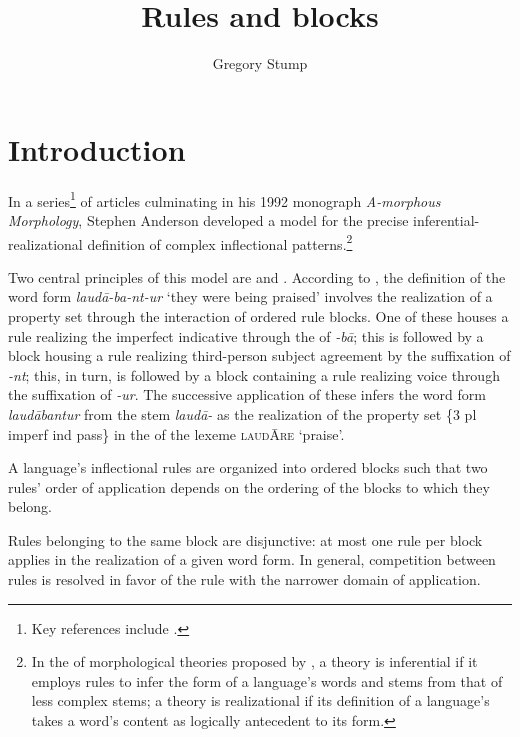 \documentclass[output=paper,
modfonts
]{LSP/langsci}
\title{Rules and blocks}
\author{%
Gregory Stump\affiliation{University of Kentucky}
}
\begin{document}
\maketitle

\section{Introduction}

In a series\footnote{Key references include \citealt{Anderson1977a,Anderson1982,Anderson1984,Anderson1984b,Anderson1986}.} of articles culminating in his 1992 monograph \textit{A\nobreakdash-morphous Morphology}, Stephen Anderson developed a model for the precise inferential-realizational definition of complex inflectional patterns.\footnote{In the  of morphological theories proposed by \citet{Stump2001}, a theory is inferential if it employs rules to infer the form of a language’s words and stems from that of less complex stems; a theory is realizational if its definition of a language’s  takes a word’s content as logically antecedent to its form.}

Two central principles of this model are  and .  According to , the definition of the  word form \textit{laud\=a-ba-nt-ur} ‘they were being praised’ involves the realization of a  property set through the interaction of ordered rule blocks.  One of these houses a rule realizing the imperfect indicative through the  of \textit{{}-b\=a}; this is followed by a block housing a rule realizing third-person  subject agreement by the suffixation of \textit{{}-nt}; this, in turn, is followed by a block containing a rule realizing  voice through the suffixation of \textit{-ur}.  The successive application of these  infers the word form \textit{laud\=abantur} from the stem \textit{laud\=a-} as the realization of the property set \{3 pl imperf ind pass\} in the  of the lexeme \textsc{laud{\scriptsize{}Ā}re} ‘praise’.

\ea \label{ex:stump:1}%
	   A language’s inflectional rules are organized into ordered blocks such that two rules’ order of application depends on the ordering of the blocks to which they belong.
\z

\ea \label{ex:stump:2}%
Rules belonging to the same block are disjunctive:  at most one rule per block applies in the realization of a given word form.  In general, competition between rules is resolved in favor of the rule with the narrower domain of application. 
    \z
\end{document}
